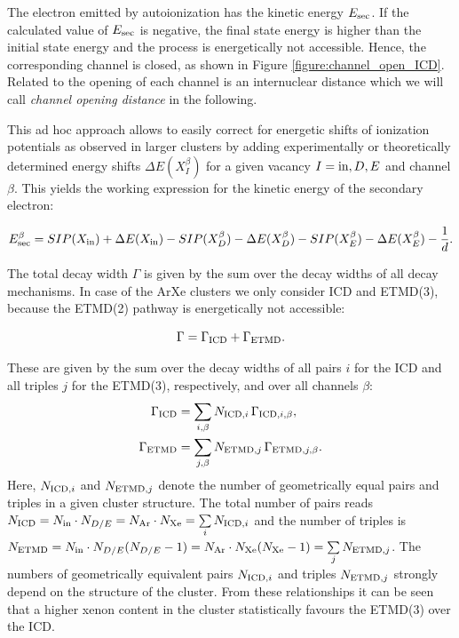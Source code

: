 The electron emitted by autoionization has the kinetic energy $E_{\rm sec}$. 
If the calculated value of $E_{\rm sec}$ is negative,
the final state energy is higher than the initial state energy and the        
process is energetically not accessible. Hence, the corresponding channel     
is closed, as shown in Figure \ref{figure:channel_open_ICD}. Related to
the opening of each channel is an internuclear distance which we will call 
\emph{channel opening distance} in the following.
                                                               
This {\latin ad hoc} approach allows to easily correct for energetic shifts of ionization potentials as observed in larger clusters by adding experimentally or theoretically determined energy shifts $\Delta E(X_{I}^{\beta})$ for a given vacancy $I={\rm in},D,E$ and channel $\beta$. This yields the working expression for the kinetic energy of the secondary electron:

\begin{equation}
 E_{\rm sec}^\beta = SIP(X_{\rm in}) + \Delta E (X_{\rm in})
               - SIP(X_{D}^\beta) - \Delta E (X_{D}^\beta)
               - SIP(X_{E}^\beta) - \Delta E (X_{E}^\beta)
               - \frac 1d .
\end{equation}

The total decay width $\Gamma$ is given by the sum over the decay widths
of all decay mechanisms. In case of the ArXe clusters we only consider
ICD and ETMD(3), because the ETMD(2) pathway is energetically not accessible:

\begin{equation}
 \Gamma = \Gamma_{\rm ICD} + \Gamma_{\rm ETMD} .
\end{equation}

These are given by the sum over the decay widths of all pairs $i$ for the
ICD and all triples $j$ for the ETMD(3), respectively, and over all channels $\beta$:
%
\begin{align}
 \Gamma_{\rm ICD}  &= \sum\limits_{i,\beta} N_{{\rm ICD},i}  \, \Gamma_{{\rm ICD},i,\beta},\\
 \Gamma_{\rm ETMD} &= \sum\limits_{j,\beta} N_{{\rm ETMD},j} \, \Gamma_{{\rm ETMD},j,\beta}.
\end{align}
Here, $N_{{\rm ICD},i}$ and $N_{{\rm ETMD},j}$ denote the number of geometrically
equal pairs and triples in a given cluster structure. The total number of pairs
reads
$N_{{\rm ICD}} = N_{\rm in} \cdot N_{D/E} = N_{\rm Ar} \cdot N_{\rm Xe}
 = \sum\limits_i N_{{\rm ICD},i}$ and the number of triples is
$N_{{\rm ETMD}} = N_{\rm in} \cdot N_{D/E} (N_{D/E} - 1) = N_{\rm Ar} \cdot N_{\rm Xe} (N_{\rm Xe} - 1)
 = \sum\limits_j N_{{\rm ETMD},j}$.
The numbers of geometrically equivalent pairs $N_{{\rm ICD},i}$ and triples $N_{{\rm ETMD},j}$
strongly depend on the structure of the cluster. From these relationships
it can be seen that a higher xenon content in the cluster statistically
favours the ETMD(3) over the ICD.

